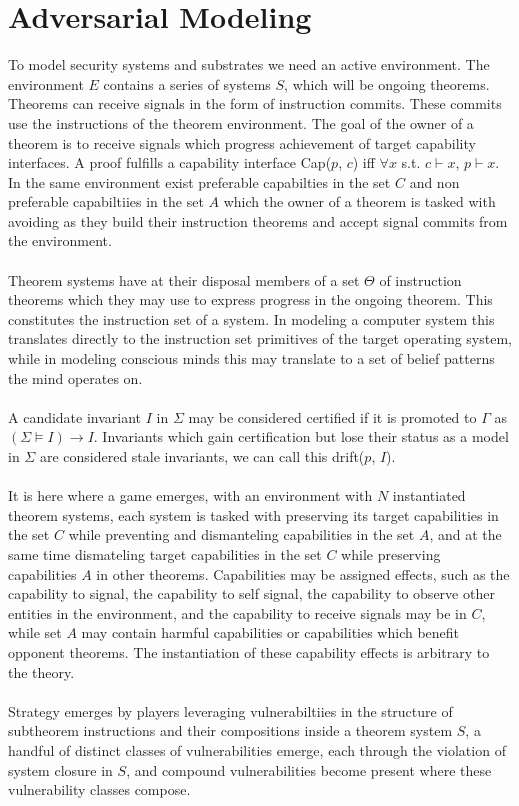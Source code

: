 \documentclass{article}
\begin{document}
	\section{Adversarial Modeling}
	To model security systems and substrates we need an active environment. The environment $E$ contains a series of systems $S$, which will be ongoing theorems. Theorems can receive signals in the form of instruction commits. These commits use the instructions of the theorem environment. The goal of the owner of a theorem is to receive signals which progress achievement of target capability interfaces. A proof fulfills a capability interface Cap($p$, $c$) iff $\forall x$ s.t. $c \vdash x$, $p \vdash x$. In the same environment exist preferable capabilties in the set $C$ and non preferable capabiltiies in the set $A$ which the owner of a theorem is tasked with avoiding as they build their instruction theorems and accept signal commits from the environment.\\\\
	Theorem systems have at their disposal members of a set $\Theta$ of instruction theorems which they may use to express progress in the ongoing theorem. This constitutes the instruction set of a system. In modeling a computer system this translates directly to the instruction set primitives of the target operating system, while in modeling conscious minds this may translate to a set of belief patterns the mind operates on. \\\\
	A candidate invariant $I$ in $\Sigma$ may be considered certified if it is promoted to $\Gamma$ as $(\Sigma \models I) \rightarrow I$. Invariants which gain certification but lose their status as a model in $\Sigma$ are considered stale invariants, we can call this drift($p$, $I$).\\\\
	It is here where a game emerges, with an environment with $N$ instantiated theorem systems, each system is tasked with preserving its target capabilities in the set $C$ while preventing and dismanteling capabilities in the set $A$, and at the same time dismateling target capabilities in the set $C$ while preserving capabilities $A$ in other theorems. Capabilities may be assigned effects, such as the capability to signal, the capability to self signal, the capability to observe other entities in the environment, and the capability to receive signals may be in $C$, while set $A$ may contain harmful capabilities or capabilities which benefit opponent theorems. The instantiation of these capability effects is arbitrary to the theory.\\\\
	Strategy emerges by players leveraging vulnerabiltiies in the structure of subtheorem instructions and their compositions inside a theorem system $S$, a handful of distinct classes of vulnerabilities emerge, each through the violation of system closure in $S$, and compound vulnerabilities become present where these vulnerability classes compose.
\end{document}
